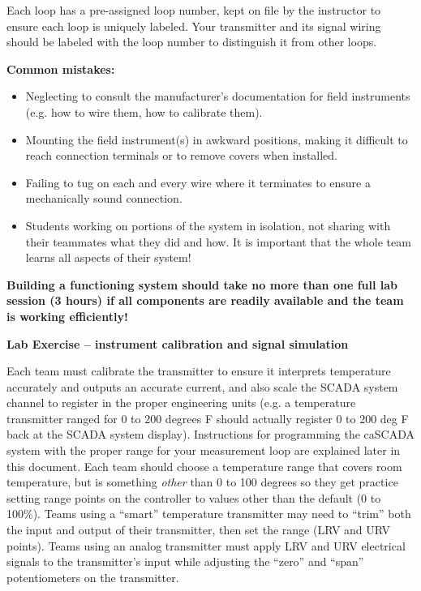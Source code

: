 Each loop has a pre-assigned loop number, kept on file by the instructor to ensure each loop is uniquely labeled.  Your transmitter and its signal wiring should be labeled with the loop number to distinguish it from other loops.

\vskip 10pt

{\bf Common mistakes:}

\begin{itemize}
\item{} Neglecting to consult the manufacturer's documentation for field instruments (e.g. how to wire them, how to calibrate them).
\item{} Mounting the field instrument(s) in awkward positions, making it difficult to reach connection terminals or to remove covers when installed.
\item{} Failing to tug on each and every wire where it terminates to ensure a mechanically sound connection.
\item{} Students working on portions of the system in isolation, not sharing with their teammates what they did and how.  It is important that the whole team learns all aspects of their system!
\end{itemize}

\vskip 10pt

{\bf Building a functioning system should take no more than one full lab session (3 hours) if all components are readily available and the team is working efficiently!}







\vfil \eject

\noindent
{\bf Lab Exercise -- instrument calibration and signal simulation}

\vskip 5pt

Each team must calibrate the transmitter to ensure it interprets temperature accurately and outputs an accurate current, and also scale the SCADA system channel to register in the proper engineering units (e.g. a temperature transmitter ranged for 0 to 200 degrees F should actually register 0 to 200 deg F back at the SCADA system display).  Instructions for programming the caSCADA system with the proper range for your measurement loop are explained later in this document.  Each team should choose a temperature range that covers room temperature, but is something {\it other} than 0 to 100 degrees so they get practice setting range points on the controller to values other than the default (0 to 100\%).  Teams using a ``smart'' temperature transmitter may need to ``trim'' both the input and output of their transmitter, then set the range (LRV and URV points).  Teams using an analog transmitter must apply LRV and URV electrical signals to the transmitter's input while adjusting the ``zero'' and ``span'' potentiometers on the transmitter.

